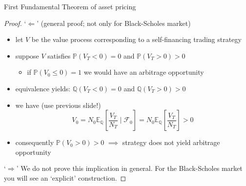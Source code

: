 \documentclass[pdf, handout]{beamer}
\renewcommand{\calF}{\mathcal{F}}
\begin{document}
\begin{frame}{First Fundamental Theorem of asset pricing}
\begin{proof} `$\Leftarrow$' (general proof; not only for Black-Scholes market)
\begin{itemize}
\item let $V$ be the value process corresponding to a self-financing trading strategy
\item suppose $V$ satisfies $\mathbb{P}(V_T < 0 ) =0$ and $\mathbb{P}(V_T>0) >0$
\begin{itemize}
\item if $\mathbb{P}(V_0 \leq 0)=1$ we would have an arbitrage opportunity
\end{itemize}
\item equivalence yields: $\mathbb{Q}(V_T < 0 ) =0$ and $\mathbb{Q}(V_T>0) >0$
\item we have (use previous slide!)
\[
V_0 = N_0 \mathbb{E}_\mathbb{Q} \left[  \frac{V_T}{N_T} \mid \calF_0 \right]
=N_0 \mathbb{E}_\mathbb{Q} \left[  \frac{V_T}{N_T}  \right] >0
\]
\item consequently $\mathbb{P}(V_0>0)>0$ $\implies$ strategy does not yield arbitrage opportunity 
\end{itemize}
`$\Rightarrow$' We do not prove this implication in general. For the Black-Scholes market you will see an `explicit' construction.
\end{proof}
\end{frame}
\end{document}
